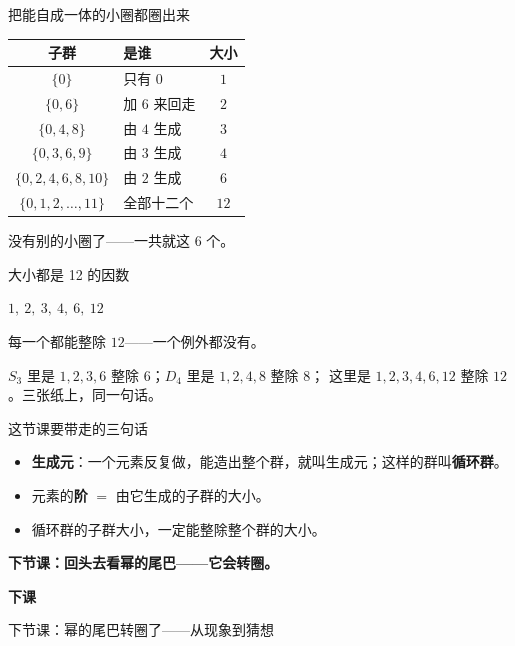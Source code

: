 \documentclass[10pt]{beamer}
\begin{document}
\begin{frame}{把能自成一体的小圈都圈出来}
  \begin{center}
  \begin{tabular}{@{}clc@{}}
    \toprule
    子群 & 是谁 & 大小 \\
    \midrule
    \(\{0\}\) & 只有 \(0\) & \(1\) \\
    \(\{0,6\}\) & 加 \(6\) 来回走 & \(2\) \\
    \(\{0,4,8\}\) & 由 \(4\) 生成 & \(3\) \\
    \(\{0,3,6,9\}\) & 由 \(3\) 生成 & \(4\) \\
    \(\{0,2,4,6,8,10\}\) & 由 \(2\) 生成 & \(6\) \\
    \(\{0,1,2,\dots,11\}\) & 全部十二个 & \(12\) \\
    \bottomrule
  \end{tabular}
  \end{center}
  \pause
  \begin{center}
    {\large 没有别的小圈了——一共就这 \(6\) 个。}
  \end{center}
\end{frame}

\begin{frame}{大小都是 12 的因数}
  \begin{center}
    {\Large \(1,\ 2,\ 3,\ 4,\ 6,\ 12\)}
  \end{center}
  \pause
  \begin{center}
    {\large 每一个都能整除 \(12\)——一个例外都没有。}
  \end{center}
  \pause
  \begin{att}
    \(S_3\) 里是 \(1,2,3,6\) 整除 \(6\)；\(D_4\) 里是 \(1,2,4,8\) 整除 \(8\)；
    这里是 \(1,2,3,4,6,12\) 整除 \(12\)。三张纸上，同一句话。
  \end{att}
\end{frame}

\begin{frame}{这节课要带走的三句话}
  \begin{itemize}
    \item \textbf{生成元}：一个元素反复做，能造出整个群，就叫生成元；这样的群叫\textbf{循环群}。
    \item 元素的\textbf{阶} \(=\) 由它生成的子群的大小。
    \item 循环群的子群大小，一定能整除整个群的大小。
  \end{itemize}
  \pause
  \begin{center}
    {\large\textcolor{textgreen}{\bfseries 下节课：回头去看幂的尾巴——它会转圈。}}
  \end{center}
\end{frame}

\begin{frame}
  \begin{center}
    \vspace{1.6cm}
    {\Large\textcolor{textgreen}{\bfseries 下课}}

    \vspace{1.0cm}
    {\large\textcolor{accentgreen}{下节课：幂的尾巴转圈了——从现象到猜想}}
  \end{center}
\end{frame}
\end{document}
